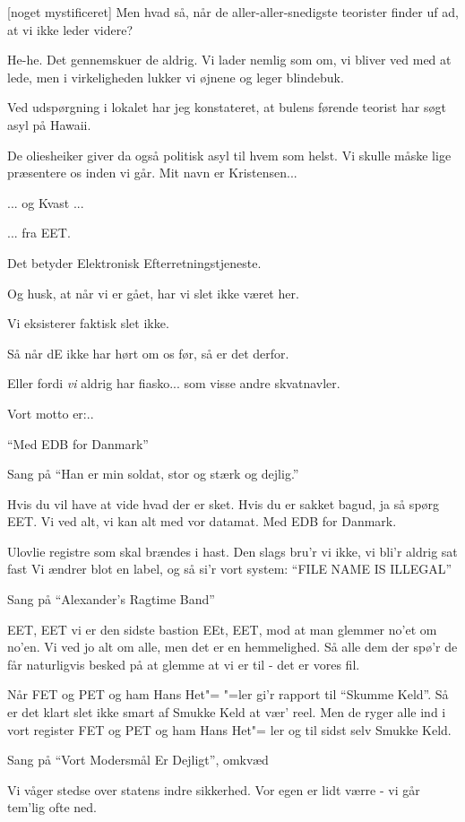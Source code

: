 \documentclass[a4paper,11pt]{article}
\begin{document}
\begin{sketch}
  [noget mystificeret] Men hvad så, når de
  aller-aller-snedigste teorister finder uf ad, at vi ikke leder
  videre?

   He-he.  Det gennemskuer de aldrig.  Vi lader nemlig som om,
  vi bliver ved med at lede, men i virkeligheden lukker vi øjnene og
  leger blindebuk.


   Ved udspørgning i lokalet har jeg konstateret, at bulens
  førende teorist har søgt asyl på Hawaii.

   De oliesheiker giver da også politisk asyl til hvem som
  helst.  Vi skulle måske lige præsentere os inden vi går.   Mit navn er Kristensen...

   ... og Kvast ...

   ... fra EET.

   Det betyder Elektronisk Efterretningstjeneste.

   Og husk, at når vi er gået, har vi slet ikke været her.

   Vi eksisterer faktisk slet ikke.

   Så når dE ikke har hørt om os før, så er det derfor.

   Eller fordi {\em vi} aldrig har fiasko... som visse andre skvatnavler.

   Vort motto er:..

   "`Med EDB for Danmark"' 

\end{sketch}

Sang på "`Han er min soldat, stor og stærk og dejlig."'

\begin{song}
Hvis du vil have at vide hvad der er sket.
Hvis du er sakket bagud, ja så spørg EET.
Vi ved alt, vi kan alt med vor datamat.
Med EDB for Danmark.

Ulovlie registre som skal brændes i hast.
Den slags bru'r vi ikke, vi bli'r aldrig sat fast
Vi ændrer blot en label, og så si'r vort system:
"`FILE NAME IS ILLEGAL"'
\end{song}

Sang på "`Alexander's Ragtime Band"'

\begin{song}
EET, EET
vi er den sidste bastion
EEt, EET,
mod at man glemmer no'et om no'en.
Vi ved jo alt om alle, men det er en hemmelighed.
Så alle dem der spø'r de får naturligvis besked
på at glemme at vi er til
- det er vores fil.

Når FET og PET og ham Hans Het"=
"=ler gi'r rapport til "`Skumme Keld"'.
Så er det klart slet ikke smart
af Smukke Keld at vær' reel.
Men de ryger alle ind i vort register
FET og PET og ham Hans Het"=
ler og til sidst selv Smukke Keld.
\end{song}

Sang på "`Vort Modersmål Er Dejligt"', omkvæd

\begin{song}
Vi våger stedse over statens indre sikkerhed.
Vor egen er lidt værre - vi går tem'lig ofte ned.
\end{song}
\end{document}
